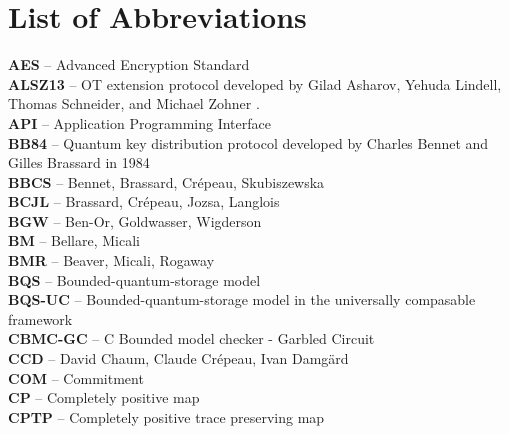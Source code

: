 \chapter*{List of Abbreviations}


\textbf{AES} -- Advanced Encryption Standard
\vspace{0.5cm}\\
\textbf{ALSZ13} -- OT extension protocol developed by Gilad Asharov, Yehuda Lindell, Thomas Schneider, and Michael Zohner \cite{ALSZ13}.
\vspace{0.5cm}\\
\textbf{API} -- Application Programming Interface
\vspace{0.5cm}\\
\textbf{BB84} -- Quantum key distribution protocol developed by Charles Bennet and Gilles Brassard in 1984 \cite{BB84}
\vspace{0.5cm}\\
\textbf{BBCS} -- Bennet, Brassard, Crépeau, Skubiszewska
\vspace{0.5cm}\\
\textbf{BCJL} -- Brassard, Crépeau, Jozsa, Langlois
\vspace{0.5cm}\\
\textbf{BGW} -- Ben-Or, Goldwasser, Wigderson
\vspace{0.5cm}\\
\textbf{BM} -- Bellare, Micali
\vspace{0.5cm}\\
\textbf{BMR} -- Beaver, Micali, Rogaway
\vspace{0.5cm}\\
\textbf{BQS} -- Bounded-quantum-storage model
\vspace{0.5cm}\\
\textbf{BQS-UC} -- Bounded-quantum-storage model in the universally compasable framework
\vspace{0.5cm}\\
\textbf{CBMC-GC} -- C Bounded model checker - Garbled Circuit
\vspace{0.5cm}\\
\textbf{CCD} -- David Chaum, Claude Crépeau, Ivan Damg\"{a}rd
\vspace{0.5cm}\\
\textbf{COM} -- Commitment
\vspace{0.5cm}\\
\textbf{CP} -- Completely positive map
\vspace{0.5cm}\\
\textbf{CPTP} -- Completely positive trace preserving map

